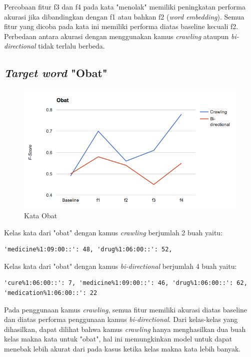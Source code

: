 Percobaan fitur f3 dan f4 pada kata "menolak" memiliki peningkatan performa akurasi jika dibandingkan dengan f1 atau bahkan f2 (\textit{word embedding}). Semua fitur yang dicoba pada kata ini memiliki performa diatas baseline kecuali f2. Perbedaan antara akurasi dengan menggunakan kamus \textit{crawling} ataupun \textit{bi-directional} tidak terlalu berbeda.

\subsection{\textit{Target word} "Obat"}

\begin{figure}
	\centering
	\includegraphics[width=1\linewidth]{adit_pics/obat.png}
	\caption{Kata Obat}
	\label{fig:obat}
\end{figure}

Kelas kata dari "obat" dengan kamus \textit{crawling} berjumlah 2 buah yaitu:
\begin{lstlisting}
'medicine%1:09:00::': 48, 'drug%1:06:00::': 52, 
\end{lstlisting}
Kelas kata dari "obat" dengan kamus \textit{bi-directional} berjumlah 4 buah yaitu:
\begin{lstlisting}
'cure%1:06:00::': 7, 'medicine%1:09:00::': 46, 'drug%1:06:00::': 62, 'medication%1:06:00::': 22
\end{lstlisting}

Pada penggunaan kamus \textit{crawling}, semua fitur memiliki akurasi diatas baseline dan diatas performa penggunaan kamus \textit{bi-directional}. Dari kelas-kelas yang dihasilkan, dapat dilihat bahwa kamus \textit{crawling} hanya menghasilkan dua buah kelas makna kata untuk "obat", hal ini memungkinkan model untuk dapat menebak lebih akurat dari pada kasus ketika kelas makna kata lebih banyak.

